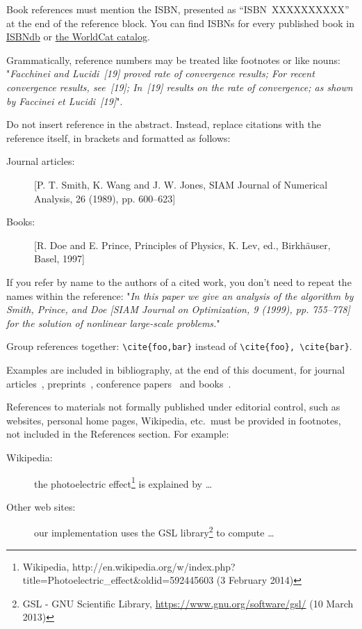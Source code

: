 \documentclass{ipol}
\begin{document}
Book references must mention the ISBN, presented as
``ISBN~XXXXXXXXXX'' at the end of the reference block. You can find
ISBNs for every published book in \href{http://isbndb.com/}{ISBNdb} or 
\href{http://www.worldcat.org/advancedsearch}{the WorldCat catalog}.

Grammatically, reference numbers may be treated like footnotes or
like nouns:
"\emph{Facchinei and Lucidi~[19] proved rate of convergence
  results; For recent convergence results, see~[19]; In~[19] results
  on the rate of convergence; as shown by Faccinei et Lucidi~[19]}".

Do not insert reference in the abstract. Instead, replace citations
with the reference itself, in brackets and formatted as follows:
\begin{description}
\item[Journal articles:]
  [P. T. Smith, K. Wang and J. W. Jones, SIAM Journal of Numerical
  Analysis, 26 (1989), pp. 600–623]
\item[Books:]
  [R. Doe and E. Prince, Principles of Physics, K. Lev, ed.,
  Birkhäuser, Basel, 1997]
\end{description}
If you refer by name to the authors of a cited work, you don’t need
to repeat the names within the reference: "\emph{In this paper we give
  an analysis of the algorithm by Smith, Prince, and Doe [SIAM Journal
    on Optimization, 9 (1999), pp. 755–778] for the solution of
  nonlinear large-scale problems.}"

Group references together: \verb|\cite{foo,bar}| instead of
\verb|\cite{foo}, \cite{bar}|.

Examples are included in bibliography, at the end of this document, for
journal articles~\cite{article}, preprints~\cite{preprint}, conference
papers~\cite{conference} and books~\cite{book}.

References to materials not formally published under editorial
control, such as websites, personal home pages, Wikipedia, etc.\ must
be provided in footnotes, not included in the References section. For example:

\begin{description}
\item[Wikipedia:]
  the photoelectric effect\footnote{Wikipedia,
    http://en.wikipedia.org/w/index.php?title=Photoelectric\_effect\&oldid=592445603 (3 February 2014)}
  is explained by \ldots
\item[Other web sites:]
  our implementation uses the GSL library\footnote{
GSL - GNU Scientific Library, \url{https://www.gnu.org/software/gsl/}
(10 March 2013)} to compute \ldots
\end{description}
\end{document}
